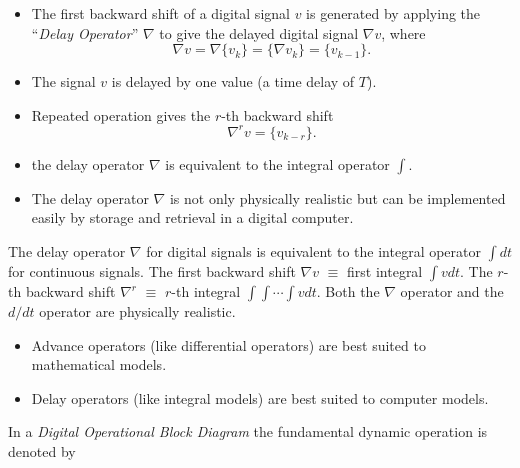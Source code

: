 \begin{slide}
  \label{slide:l7s5}
\begin{itemize}

\item   The first backward shift of a digital signal $v$ is generated by
  applying the ``\emph{Delay Operator}'' $\nabla$  to give the
  delayed  digital signal $\nabla v$, where \[ \nabla v = \nabla
  \{v_k\} = \{\nabla v_k\} = \{v_{k-1}\}.\]
  

\item   The signal $v$ is delayed by one value (a time delay of
  $T$).


\item   Repeated operation gives the $r$-th backward shift \[ \nabla^r v = \{v_{k-r}\}.\]

\item the delay operator $\nabla$ is equivalent to the integral operator
  $\int$.

\item   The delay operator $\nabla$ is not only physically realistic
  but can be implemented easily by storage and retrieval in a digital
  computer.

\end{itemize}
\end{slide}

The delay operator $\nabla$ for digital signals is equivalent to the
integral operator $\int dt$ for continuous signals. The first backward
shift $\nabla v$ $\equiv$ first integral $\int v dt$. The $r$-th
backward shift $\nabla^r$ $\equiv$ $r$-th integral $\int \int \cdots
\int v dt$. Both the $\nabla$ operator and the $d/dt$ operator are
physically realistic.

\begin{slide}
  \label{slide:l7s6}
  \begin{itemize}
  \item Advance operators (like differential operators) are best suited
    to mathematical models.
  \item Delay operators (like integral models) are best suited to
    computer models.
  \end{itemize}
  In a \emph{Digital Operational Block Diagram} the fundamental
  dynamic operation is denoted by
  \begin{center}\end{center}
\end{slide}


